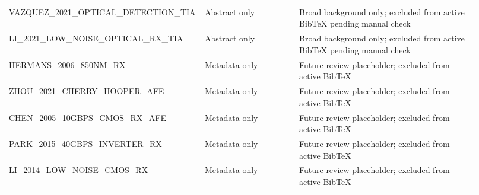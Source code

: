 {\begin{longtable}{>{\raggedright\arraybackslash}p{0.34\linewidth} >{\raggedright\arraybackslash}p{0.20\linewidth} >{\raggedright\arraybackslash}p{0.38\linewidth}}
VAZQUEZ\_2021\_OPTICAL\_DETECTION\_TIA & Abstract only & Broad background only; excluded from active BibTeX pending manual check \\
LI\_2021\_LOW\_NOISE\_OPTICAL\_RX\_TIA & Abstract only & Broad background only; excluded from active BibTeX pending manual check \\
HERMANS\_2006\_850NM\_RX & Metadata only & Future-review placeholder; excluded from active BibTeX \\
ZHOU\_2021\_CHERRY\_HOOPER\_AFE & Metadata only & Future-review placeholder; excluded from active BibTeX \\
CHEN\_2005\_10GBPS\_CMOS\_RX\_AFE & Metadata only & Future-review placeholder; excluded from active BibTeX \\
PARK\_2015\_40GBPS\_INVERTER\_RX & Metadata only & Future-review placeholder; excluded from active BibTeX \\
LI\_2014\_LOW\_NOISE\_CMOS\_RX & Metadata only & Future-review placeholder; excluded from active BibTeX \\
\end{longtable}
\normalsize
}
